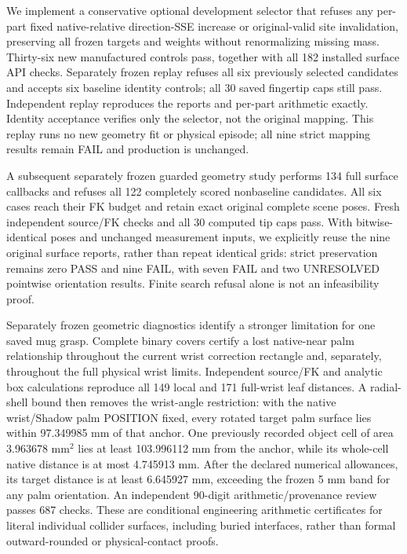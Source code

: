 We implement a conservative optional development selector that refuses any
per-part fixed native-relative direction-SSE increase or original-valid site
invalidation, preserving all frozen targets and weights without renormalizing
missing mass. Thirty-six new manufactured controls pass, together with all
182 installed surface API checks. Separately frozen replay refuses all six
previously selected candidates and accepts six baseline identity controls;
all 30 saved fingertip caps still pass. Independent replay reproduces the
reports and per-part arithmetic exactly. Identity acceptance verifies only
the selector, not the original mapping. This replay runs no new geometry fit or physical episode; all nine strict
mapping results remain FAIL and production is unchanged.

A subsequent separately frozen guarded geometry study performs 134 full
surface callbacks and refuses all 122 completely scored nonbaseline
candidates. All six cases reach their FK budget and retain exact original
complete scene poses. Fresh independent source/FK checks and all 30 computed
tip caps pass. With bitwise-identical poses and unchanged measurement inputs, we explicitly
reuse the nine original surface reports, rather than repeat identical grids:
strict preservation remains zero PASS and nine FAIL, with seven FAIL and two
UNRESOLVED pointwise orientation results. Finite search refusal alone is not
an infeasibility proof.

Separately frozen geometric diagnostics identify a stronger limitation for
one saved mug grasp. Complete binary covers certify a lost native-near palm
relationship throughout the current wrist correction rectangle and, separately,
throughout the full physical wrist limits. Independent source/FK and analytic
box calculations reproduce all 149 local and 171 full-wrist leaf distances.
A radial-shell bound then removes the wrist-angle restriction: with the native
wrist/Shadow palm POSITION fixed, every rotated target palm surface lies within
97.349985 mm of that anchor. One previously recorded object cell of area
3.963678 mm$^2$ lies at least 103.996112 mm from the anchor, while its whole-cell
native distance is at most 4.745913 mm. After the declared numerical allowances,
its target distance is at least 6.645927 mm, exceeding the frozen 5 mm band
for any palm orientation. An independent 90-digit arithmetic/provenance review
passes 687 checks. These are conditional engineering arithmetic certificates
for literal individual collider surfaces, including buried interfaces, rather
than formal outward-rounded or physical-contact proofs.

